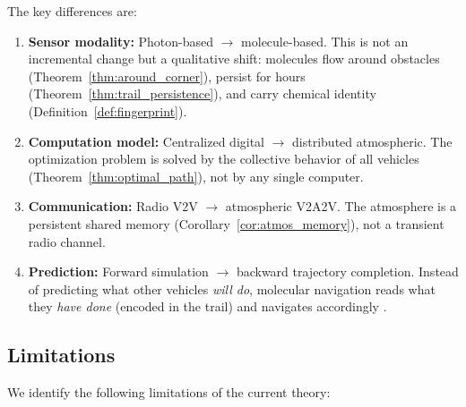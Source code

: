 \documentclass[11pt,twocolumn,a4paper]{article}
\theoremstyle{plain}
\theoremstyle{definition}
\theoremstyle{remark}
\begin{document}
The key differences are:
\begin{enumerate}[nosep]
    \item \textbf{Sensor modality:} Photon-based $\to$ molecule-based. This is not an incremental change but a qualitative shift: molecules flow around obstacles (Theorem~\ref{thm:around_corner}), persist for hours (Theorem~\ref{thm:trail_persistence}), and carry chemical identity (Definition~\ref{def:fingerprint}).

    \item \textbf{Computation model:} Centralized digital $\to$ distributed atmospheric. The optimization problem is solved by the collective behavior of all vehicles (Theorem~\ref{thm:optimal_path}), not by any single computer.

    \item \textbf{Communication:} Radio V2V $\to$ atmospheric V2A2V. The atmosphere is a persistent shared memory (Corollary~\ref{cor:atmos_memory}), not a transient radio channel.

    \item \textbf{Prediction:} Forward simulation $\to$ backward trajectory completion. Instead of predicting what other vehicles \emph{will do}, molecular navigation reads what they \emph{have done} (encoded in the trail) and navigates accordingly \cite{sachikonye2026backward}.
\end{enumerate}

\subsection{Limitations}

We identify the following limitations of the current theory:
\end{document}
